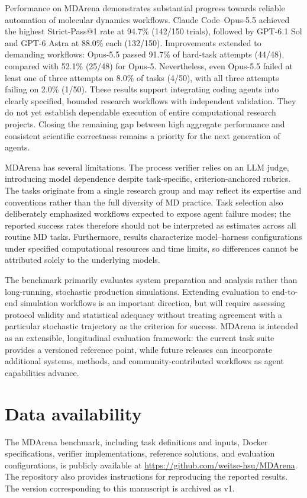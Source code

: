 Performance on MDArena demonstrates substantial progress towards reliable automation of molecular dynamics workflows. Claude Code–Opus-5.5 achieved the highest Strict-Pass@1 rate at 94.7\% (142/150 trials), followed by GPT-6.1 Sol and GPT-6 Astra at 88.0\% each (132/150). Improvements extended to demanding workflows: Opus-5.5 passed 91.7\% of hard-task attempts (44/48), compared with 52.1\% (25/48) for Opus-5. Nevertheless, even Opus-5.5 failed at least one of three attempts on 8.0\% of tasks (4/50), with all three attempts failing on 2.0\% (1/50). These results support integrating coding agents into clearly specified, bounded research workflows with independent validation. They do not yet establish dependable execution of entire computational research projects. Closing the remaining gap between high aggregate performance and consistent scientific correctness remains a priority for the next generation of agents.

MDArena has several limitations. The process verifier relies on an LLM judge, introducing model dependence despite task-specific, criterion-anchored rubrics. The tasks originate from a single research group and may reflect its expertise and conventions rather than the full diversity of MD practice. Task selection also deliberately emphasized workflows expected to expose agent failure modes; the reported success rates therefore should not be interpreted as estimates across all routine MD tasks. Furthermore, results characterize model–harness configurations under specified computational resources and time limits, so differences cannot be attributed solely to the underlying models.

The benchmark primarily evaluates system preparation and analysis rather than long-running, stochastic production simulations. Extending evaluation to end-to-end simulation workflows is an important direction, but will require assessing protocol validity and statistical adequacy without treating agreement with a particular stochastic trajectory as the criterion for success. MDArena is intended as an extensible, longitudinal evaluation framework: the current task suite provides a versioned reference point, while future releases can incorporate additional systems, methods, and community-contributed workflows as agent capabilities advance.


\section*{Data availability}


The MDArena benchmark, including task definitions and inputs, Docker specifications, verifier implementations, reference solutions, and evaluation configurations, is publicly available at
\url{https://github.com/weitse-hsu/MDArena}. The repository also provides instructions for reproducing
the reported results. The version corresponding to this manuscript is archived as v1.
